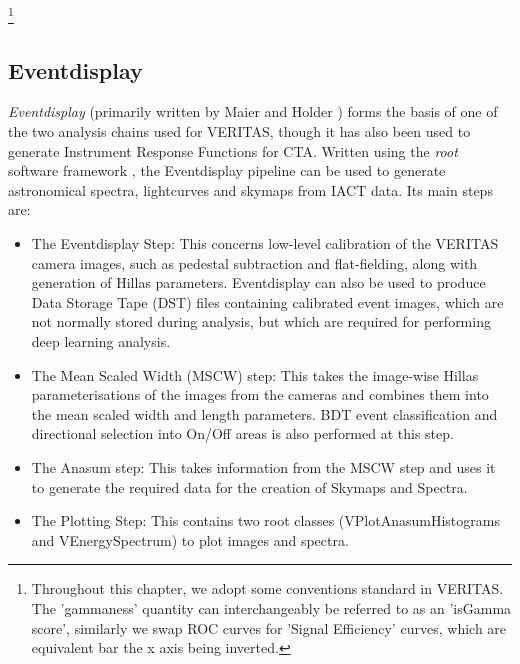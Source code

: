 \footnote{Throughout this chapter, we adopt some conventions standard in VERITAS. The 'gammaness' quantity can interchangeably be referred to as an 'isGamma score', similarly we swap ROC curves for 'Signal Efficiency' curves, which are equivalent bar the x axis being inverted.}

\subsection{Eventdisplay}

\textit{Eventdisplay} (primarily written by Maier and Holder \cite{evdisp}) forms the basis of one of the two analysis chains used for VERITAS, though it has also been used to generate Instrument Response Functions for CTA. Written using the \textit{root} software framework \cite{root}, the Eventdisplay pipeline can be used to generate astronomical spectra, lightcurves and skymaps from IACT data. Its main steps are:

\begin{itemize}
\item The Eventdisplay Step: This concerns low-level calibration of the VERITAS camera images, such as pedestal subtraction and flat-fielding, along with generation of Hillas parameters. Eventdisplay can also be used to produce Data Storage Tape (DST) files containing calibrated event images, which are not normally stored during analysis, but which are required for performing deep learning analysis.

\item The Mean Scaled Width (MSCW) step: This takes the image-wise Hillas parameterisations of the images from the cameras and combines them into the mean scaled width and length parameters. BDT event classification and directional selection into On/Off areas is also performed at this step. 

\item The Anasum step: This takes information from the MSCW step and uses it to generate the required data for the creation of Skymaps and Spectra. 

\item The Plotting Step: This contains two root classes (VPlotAnasumHistograms and VEnergySpectrum) to plot images and spectra.

\end{itemize}

